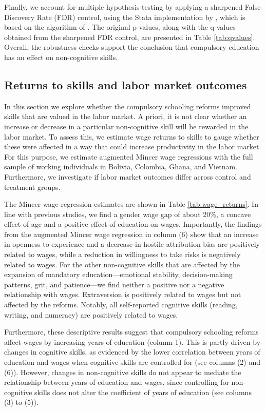 Finally, we account for multiple hypothesis testing by applying a sharpened False Discovery Rate (FDR) control, using the Stata implementation by \citet{anderson_multiple_2008}, which is based on the algorithm of \citet{benjamini_adaptive_2006}. The original p-values, along with the q-values obtained from the sharpened FDR control, are presented in Table \ref{tab:qvalues}. Overall, the robustness checks support the conclusion that compulsory education has an effect on non-cognitive skills.





\subsection{Returns to skills and labor market outcomes}

In this section we explore whether the compulsory schooling reforms improved skills that are valued in the labor market. A priori, it is not clear whether an increase or decrease in a particular non-cognitive skill will be rewarded in the labor market. To assess this, we estimate wage returns to skills to gauge whether these were affected in a way that could increase productivity in the labor market. For this purpose, we estimate augmented Mincer wage regressions with the full sample of working individuals in Bolivia, Colombia, Ghana, and Vietnam. Furthermore, we investigate if labor market outcomes differ across control and treatment groups.

The Mincer wage regression estimates are shown in Table \ref{tab:wage_returns}. In line with previous studies, we find a gender wage gap of about 20\%, a concave effect of age and a positive effect of education on wages. Importantly, the findings from the augmented Mincer wage regression in column (6) show that an increase in openness to experience and a decrease in hostile attribution bias are positively related to wages, while a reduction in willingness to take risks is negatively related to wages. For the other non-cognitive skills that are affected by the expansion of mandatory education---emotional stability, decision-making patterns, grit, and patience---we find neither a positive nor a negative relationship with wages. Extraversion is positively related to wages but not affected by the reforms. Notably, all self-reported cognitive skills (reading, writing, and numeracy) are positively related to wages.


Furthermore, these descriptive results suggest that compulsory schooling reforms affect wages by increasing years of education (column 1). This is partly driven by changes in cognitive skills, as evidenced by the lower correlation between years of education and wages when cognitive skills are controlled for (see columns (2) and (6)). However, changes in non-cognitive skills do not appear to mediate the relationship between years of education and wages, since controlling for non-cognitive skills does not alter the coefficient of years of education (see columns (3) to (5)).

